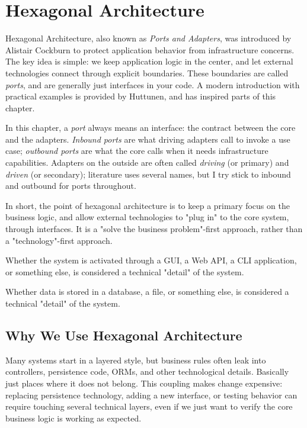 \chapter{Hexagonal Architecture}
\label{ch:hexagonal}

Hexagonal Architecture, also known as \textit{Ports and Adapters}, was introduced by Alistair Cockburn to protect application behavior from infrastructure concerns.\autocite{cockburn2005hexagonal} The key idea is simple: we keep application logic in the center, and let external technologies connect through explicit boundaries. These boundaries are called \textit{ports}, and are generally just interfaces in your code. A modern introduction with practical examples is provided by Huttunen, and has inspired parts of this chapter.\autocite{huttunen2026hexagonal}

In this chapter, a \textit{port} always means an interface: the contract between the core and the adapters. \textit{Inbound ports} are what driving adapters call to invoke a use case; \textit{outbound ports} are what the core calls when it needs infrastructure capabilities. Adapters on the outside are often called \textit{driving} (or primary) and \textit{driven} (or secondary); literature uses several names, but I try stick to inbound and outbound for ports throughout.

In short, the point of hexagonal architecture is to keep a primary focus on the business logic, and allow external technologies to "plug in" to the core system, through interfaces. It is a "solve the business problem"-first approach, rather than a "technology"-first approach.

Whether the system is activated through a GUI, a Web API, a CLI application, or something else, is considered a technical "detail" of the system.

Whether data is stored in a database, a file, or something else, is considered a technical "detail" of the system.

\section{Why We Use Hexagonal Architecture}
\label{sec:hexagonal_why}

Many systems start in a layered style, but business rules often leak into controllers, persistence code, ORMs, and other technological details. Basically just places where it does not belong. This coupling makes change expensive: replacing persistence technology, adding a new interface, or testing behavior can require touching several technical layers, even if we just want to verify the core business logic is working as expected.


